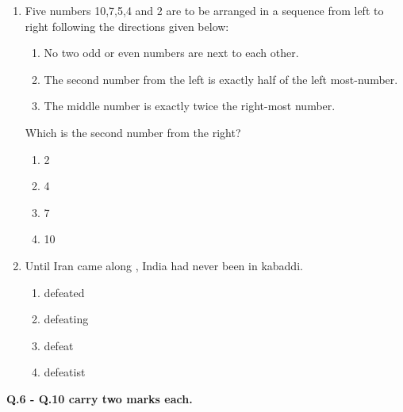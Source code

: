 \documentclass[12pt]{article}
\begin{document}
\begin{enumerate}[label = Q.\arabic*]
\begin{multicols}{4}
\begin{enumerate}[label=(\Alph*)]
			\end{enumerate}
		\end{multicols}
	\item Five numbers 10,7,5,4 and 2 are to be arranged in a sequence from left to right following the directions given below:
		\begin{enumerate}[label=\arabic*.]
			\item No two odd or even numbers are next to each other.
			\item The second number from the left is exactly half of the left most-number.
			\item The middle number is exactly twice the right-most number.
		\end{enumerate}
		Which is the second number from the right?
		\begin{multicols}{4}
			\begin{enumerate}[label=(\Alph*)]
				\item 2 \item 4 \item 7 \item 10
			\end{enumerate}
		\end{multicols}
	\item Until Iran came along , India had never been \underline{\hspace{2cm}} in kabaddi.
		\begin{multicols}{4}
			\begin{enumerate}[label=(\Alph*)]
				\item defeated \item defeating \item defeat \item defeatist
			\end{enumerate}
		\end{multicols}
		\newpage
\end{enumerate}
\noindent\textbf{Q.6 - Q.10 carry two marks each.}
\end{document}
